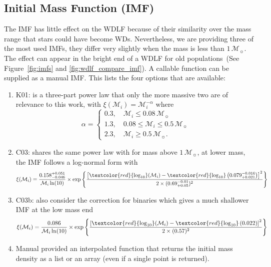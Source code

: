 \documentclass[fleqn,usenatbib]{rasti}
\newcommand{\msun}{\mathcal{M}_{\sun}}
\begin{document}
\subsection{Initial Mass Function (IMF)}
The IMF has little effect on the WDLF because of their similarity over the mass
range that stars could have become WDs. Nevertheless, we are providing three
of the most used IMFs, they differ very slightly when the mass is less than
$1\,\msun$. The effect can appear in the bright end of a WDLF for old
populations~(See Figure~\ref{fig:imfs} and \ref{fig:wdlf_compare_imf}). A
callable function can be supplied as a manual IMF. This lists the four options
that are available:

\begin{enumerate}
    \item K01: \citet{2001MNRAS.322..231K} is a three-part power law that only the
    more massive two are of relevance to this work, with
    $\xi(\mathcal{M}_i) = \mathcal{M}_i^{-\alpha}$ where
    \begin{equation}
        \alpha =
        \begin{cases}
            0.3, \quad \mathcal{M}_i \leq 0.08\,\msun\\
            1.3, \quad 0.08 \leq \mathcal{M}_i \leq 0.5\,\msun\\
            2.3, \quad \mathcal{M}_i \geq 0.5\,\msun.
        \end{cases}
    \end{equation}
    \item C03: \citet{2003PASP..115..763C} shares the same power law with
    \citet{2001MNRAS.322..231K} for mass above $1\,\msun$, at lower mass,
    the IMF follows a log-normal form with
    \begin{equation}
        \xi(\mathcal{M}_i) = \dfrac{0.158^{+0.051}_{-0.046}}{\mathcal{M}_i \ln(10)} \times
            \exp{\left\{\dfrac{\left[\textcolor{red}{\log_{10}}(\mathcal{M}_i) - \textcolor{red}{\log_{10}}\left(0.079^{-0.016}_{+0.021}\right)\right]^2}{2 \times (0.69^{-0.01}_{+0.05})^2}\right\}}
    \end{equation}
    \item C03b: \citet[][including binary]{2003PASP..115..763C} also consider the correction for binaries which gives a much shallower IMF at the low mass end
    \begin{equation}
        \xi(\mathcal{M}_i) = \dfrac{0.086}{\mathcal{M}_i \ln(10)} \times
            \exp{\left\{\dfrac{\left[\textcolor{red}{\log_{10}}(\mathcal{M}_i) - \textcolor{red}{\log_{10}}\left(0.022\right)\right]^2}{2 \times (0.57)^2}\right\}}
    \end{equation}
    \item Manual provided an interpolated function that returns the initial mass density as a list or an array (even if a single point is returned).
\end{enumerate}
\end{document}
